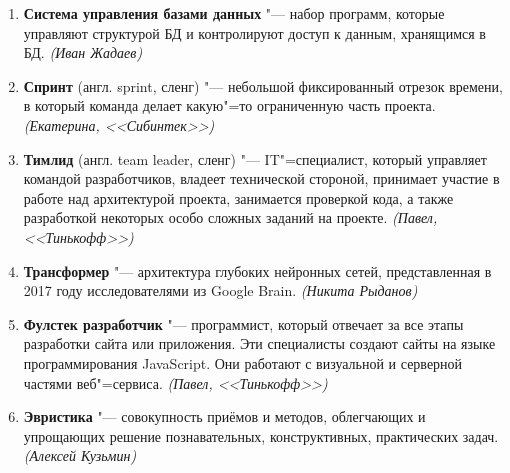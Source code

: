 \documentclass[14pt, a4paper]{extarticle}
\begin{document}
\begin{enumerate}
    \item \textbf{Система управления базами данных} "--- набор программ, которые управляют структурой БД и контролируют доступ к данным, хранящимся в БД. \textit{(Иван Жадаев)}
    \item \textbf{Спринт} (англ. sprint, сленг) "--- небольшой фиксированный отрезок времени, в который команда делает какую"=то ограниченную часть проекта. \textit{(Екатерина, <<Сибинтек>>)}
    \item \textbf{Тимлид} (англ. team leader, сленг) "--- IT"=специалист, который управляет командой разработчиков, владеет технической стороной, принимает участие в работе над архитектурой проекта, занимается проверкой кода, а также разработкой некоторых особо сложных заданий на проекте. \textit{(Павел, <<Тинькофф>>)}
    \item \textbf{Трансформер} "--- архитектура глубоких нейронных сетей, представленная в 2017 году исследователями из Google Brain. \textit{(Никита Рыданов)}
    \item \textbf{Фулстек разработчик} "--- программист, который отвечает за все этапы разработки сайта или приложения. Эти специалисты создают сайты на языке программирования JavaScript. Они работают с визуальной и серверной частями веб"=сервиса. \textit{(Павел, <<Тинькофф>>)}
    \item \textbf{Эвристика} "--- совокупность приёмов и методов, облегчающих и упрощающих решение познавательных, конструктивных, практических задач. \textit{(Алексей Кузьмин)}
\end{enumerate}
\end{document}
